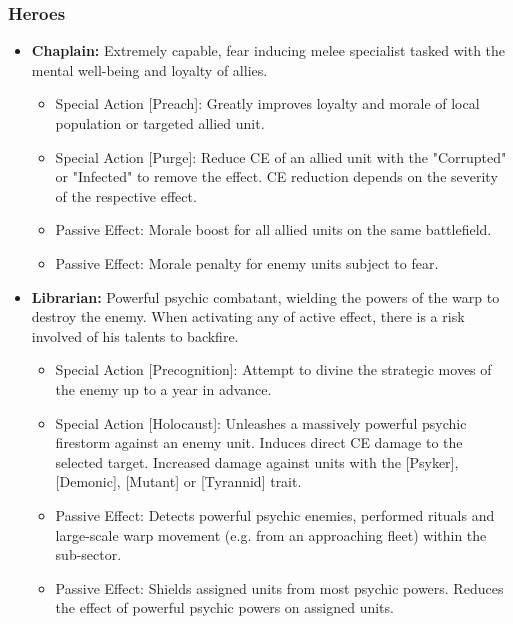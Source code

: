 \subsubsection{Heroes}
\begin{itemize}
    \item \textbf{Chaplain:} Extremely capable, fear inducing melee specialist tasked with the mental well-being and loyalty of allies.
    \begin{itemize}
        \item Special Action [Preach]: Greatly improves loyalty and morale of local population or targeted allied unit.
        \item Special Action [Purge]: Reduce CE of an allied unit with the "Corrupted" or "Infected" to remove the effect. CE reduction depends on the severity of the respective effect.
        \item Passive Effect: Morale boost for all allied units on the same battlefield.
        \item Passive Effect: Morale penalty for enemy units subject to fear.
    \end{itemize}
    
    \item \textbf{Librarian:} Powerful psychic combatant, wielding the powers of the warp to destroy the enemy. When activating any of active effect, there is a risk involved of his talents to backfire.
    \begin{itemize}
        \item Special Action [Precognition]: Attempt to divine the strategic moves of the enemy up to a year in advance.
        \item Special Action [Holocaust]: Unleashes a massively powerful psychic firestorm against an enemy unit. Induces direct CE damage to the selected target. Increased damage against units with the [Psyker], [Demonic], [Mutant] or [Tyrannid] trait.
        \item Passive Effect: Detects powerful psychic enemies, performed rituals and large-scale warp movement (e.g. from an approaching fleet) within the sub-sector.
        \item Passive Effect: Shields assigned units from most psychic powers. Reduces the effect of powerful psychic powers on assigned units.
    \end{itemize}


\end{itemize}
